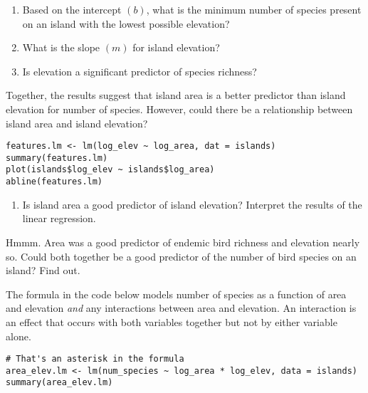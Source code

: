 \documentclass[11pt]{article}
\newcommand{\bigSpace}{\vspace{4\baselineskip}}
\begin{document}
\begin{enumerate}[resume]

\item Based on the intercept $(b)$, what is the minimum number of species present on an island with the lowest possible elevation?

\vspace{2\baselineskip}

\item What is the slope $(m)$ for island elevation?

\vspace{2\baselineskip}

\item Is elevation a significant predictor of species richness? 

\bigSpace

\end{enumerate}

Together, the results suggest that island area is a better predictor than island elevation for number of species. However, could there be a relationship between island area and island elevation?

\begin{verbatim}
features.lm <- lm(log_elev ~ log_area, dat = islands)
summary(features.lm)
plot(islands$log_elev ~ islands$log_area)
abline(features.lm)
\end{verbatim}

\begin{enumerate}[resume]
\item Is island area a good predictor of island elevation? Interpret the results of the linear regression.

\bigSpace

\end{enumerate}

Hmmm. Area was a good predictor of endemic bird richness and elevation nearly so. Could both together be a good predictor of the number of bird species on an island? Find out.

The formula in the code below models number of species as a function of area and elevation \emph{and} any interactions between area and elevation. An interaction is an effect that occurs with  both variables together but not by either variable alone.

\begin{verbatim}
# That's an asterisk in the formula
area_elev.lm <- lm(num_species ~ log_area * log_elev, data = islands)
summary(area_elev.lm)
\end{verbatim}
\end{document}
